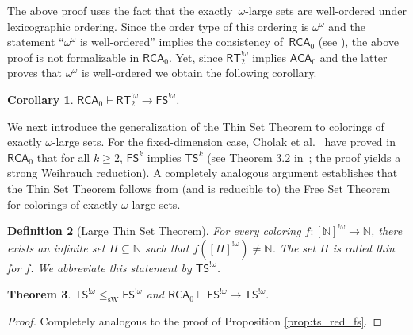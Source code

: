 \documentclass[10pt,a4paper]{article}
\newcommand{\RCA}[0]{\mathsf{RCA}}
\newcommand{\ACA}[0]{\mathsf{ACA}}
\newcommand{\FS}[0]{\mathsf{FS}}
\newcommand{\TS}[0]{\mathsf{TS}}
\newcommand{\RT}[0]{\mathsf{RT}}
\newcommand{\NN}[0]{\mathbb{N}}
\newcommand{\sW}{\mathrm{sW}}
\def\qt#1{``#1''}%
\newtheorem{theorem}{Theorem}
\numberwithin{theorem}{section}
\newtheorem{definition}[theorem]{Definition}
\newtheorem{corollary}[theorem]{Corollary}
\begin{document}
The above proof uses the fact that the exactly~$\omega$-large sets are well-ordered under lexicographic ordering. Since the order type of this ordering is $\omega^\omega$ and the statement \qt{$\omega^\omega$ is well-ordered} implies the consistency of~$\RCA_0$ (see \cite{gentzen1967wiederspruchsfreiheit,hajek1998metamathematics}), the above proof is not formalizable in $\RCA_0$. Yet, since $\RT^{!\omega}_2$ implies $\ACA_0$ and the latter proves that $\omega^\omega$ is well-ordered we obtain the following corollary.

\begin{corollary}\label{cor:RTtoFS}
    $\RCA_0 \vdash \RT^{!\omega}_2 \to \FS^{!\omega}$.
\end{corollary}


We next introduce the generalization of the Thin Set Theorem to colorings of exactly $\omega$-large sets. For the fixed-dimension case, Cholak et al.~\cite{Cholak_Giusto_Hirst_Jockusch_2005} have proved in $\RCA_0$ that for all $k\geq 2$, $\FS^k$ implies $\TS^k$ %
(see Theorem 3.2 in~\cite{Cholak_Giusto_Hirst_Jockusch_2005}; the proof yields a strong Weihrauch reduction). A completely analogous argument establishes that the Thin Set Theorem follows from (and is reducible to) the Free Set Theorem for colorings of exactly $\omega$-large sets. 

\begin{definition}[Large Thin Set Theorem]\label{thm:thin}
For every coloring $f:[\NN]^{!\omega} \to \NN$, there exists an infinite set $H\subseteq \NN$ such that $f([H]^{!\omega}) \neq \NN$. The set $H$ is called \emph{thin} for $f$. We abbreviate this statement by $\TS^{!\omega}$.
\end{definition}


\begin{theorem}\label{thm:thin-sw-fs-omega}
$\TS^{!\omega} \leq_{\sW} \FS^{!\omega}$ and $\RCA_0 \vdash \FS^{!\omega}\to \TS^{!\omega}.$
\end{theorem}

\begin{proof} Completely analogous to the proof of Proposition \ref{prop:ts_red_fs}.

\end{proof}
\end{document}
